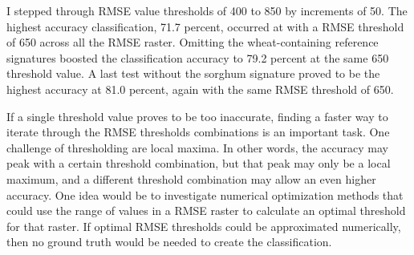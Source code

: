 I stepped through RMSE value thresholds of 400 to 850 by increments of 50. The highest accuracy classification, 71.7 percent, occurred at with a RMSE threshold of 650 across all the RMSE raster. Omitting the wheat-containing reference signatures boosted the classification accuracy to 79.2 percent at the same 650 threshold value. A last test without the sorghum signature proved to be the highest accuracy at 81.0 percent, again with the same RMSE threshold of 650.

If a single threshold value proves to be too inaccurate, finding a faster way to iterate through the RMSE thresholds combinations is an important task. One challenge of thresholding are local maxima. In other words, the accuracy may peak with a certain threshold combination, but that peak may only be a local maximum, and a different threshold combination may allow an even higher accuracy. One idea would be to investigate numerical optimization methods that could use the range of values in a RMSE raster to calculate an optimal threshold for that raster. If optimal RMSE thresholds could be approximated numerically, then no ground truth would be needed to create the classification.
